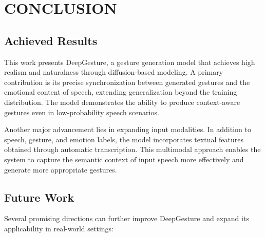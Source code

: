 \section{CONCLUSION}
\label{sec:conclusion}



\subsection{Achieved Results}

This work presents DeepGesture, a gesture generation model that achieves high realism and naturalness through diffusion-based modeling. A primary contribution is its precise synchronization between generated gestures and the emotional content of speech, extending generalization beyond the training distribution. The model demonstrates the ability to produce context-aware gestures even in low-probability speech scenarios.

Another major advancement lies in expanding input modalities. In addition to speech, gesture, and emotion labels, the model incorporates textual features obtained through automatic transcription. This multimodal approach enables the system to capture the semantic context of input speech more effectively and generate more appropriate gestures.

\subsection{Future Work}

Several promising directions can further improve DeepGesture and expand its applicability in real-world settings:

